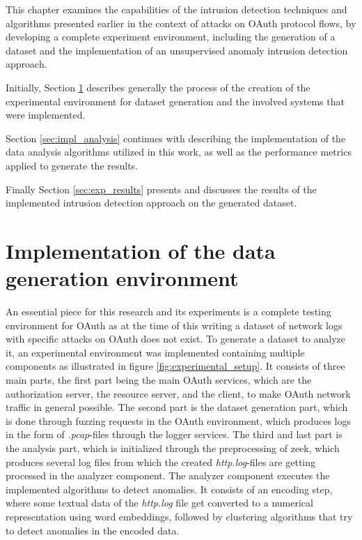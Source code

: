 
This chapter examines the capabilities of the intrusion detection techniques and algorithms presented earlier in the context of attacks on OAuth protocol flows, by developing a complete experiment environment, including the generation of a dataset and the implementation of an unsupervised anomaly intrusion detection approach.

Initially, Section \ref{sec:exp_setup} describes generally the process of the creation of the experimental environment for dataset generation and the involved systems that were implemented.

Section \ref{sec:impl_analysis} continues with describing the implementation of the data analysis algorithms utilized in this work, as well as the performance metrics applied to generate the results.

Finally Section \ref{sec:exp_results} presents and discusses the results of the implemented intrusion detection approach on the generated dataset.


\section{Implementation of the data generation environment}
\label{sec:exp_setup}

An essential piece for this research and its experiments is a complete testing environment for OAuth as at the time of this writing a dataset of network logs with specific attacks on OAuth does not exist. To generate a dataset to analyze it, an experimental environment was implemented containing multiple components as illustrated in figure \ref{fig:experimental_setup}. It consists of three main parts, the first part being the main OAuth services, which are the authorization server, the resource server, and the client, to make OAuth network traffic in general possible. The second part is the dataset generation part, which is done through fuzzing requests in the OAuth environment, which produces logs in the form of \emph{.pcap}-files through the logger services. The third and last part is the analysis part, which is initialized through the preprocessing of zeek, which produces several log files from which the created \emph{http.log}-files are getting processed in the analyzer component. The analyzer component executes the implemented algorithms to detect anomalies. It consists of an encoding step, where some textual data of the \emph{http.log} file get converted to a numerical representation using word embeddings, followed by clustering algorithms that try to detect anomalies in the encoded data.

